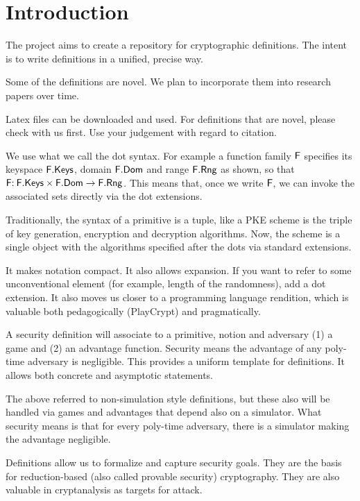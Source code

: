 
\section{Introduction}\label{sec-intro}

The project aims to create a repository for cryptographic definitions. The intent is to write definitions in a unified, precise way. 

Some of the definitions are novel. We plan to incorporate them into research papers over time. 

Latex files can be downloaded and used. For definitions that are novel, please check with us first. Use your judgement with regard to citation.

 We use what we call the dot syntax. For example a function family $\mathsf{F}$ specifies its keyspace $\mathsf{F}.\mathsf{Keys}$, domain $\mathsf{F}.\mathsf{Dom}$ and range $\mathsf{F}.\mathsf{Rng}$ as shown, so that $\mathsf{F} {:\:} \mathsf{F}.\mathsf{Keys} \times \mathsf{F}.\mathsf{Dom}\to \mathsf{F}.\mathsf{Rng}$. This means that, once we write $\mathsf{F}$, we can invoke the associated sets directly via the dot extensions. 

Traditionally, the syntax of a primitive is a tuple, like a PKE scheme is the triple of key generation, encryption and decryption algorithms. Now, the scheme is a single object with the algorithms specified after the dots via standard extensions. 

It makes notation compact. It also allows expansion. If you want to refer to some unconventional element (for example, length of the randomness), add a dot extension. It also moves us closer to a programming language rendition, which is valuable both pedagogically (PlayCrypt) and pragmatically.

 A security definition will associate to a primitive, notion and adversary (1) a game and (2) an advantage function. Security means the advantage of any poly-time adversary is negligible. This provides a uniform template for definitions. It allows both concrete and asymptotic statements. 

The above referred to non-simulation style definitions, but these also will be handled via games and advantages that depend also on a simulator. What security means is that for every poly-time adversary, there is a simulator making the advantage negligible.


 Definitions allow us to formalize and capture security goals. They are the basis for reduction-based (also called provable security) cryptography. They are also valuable in cryptanalysis as targets for attack. 

